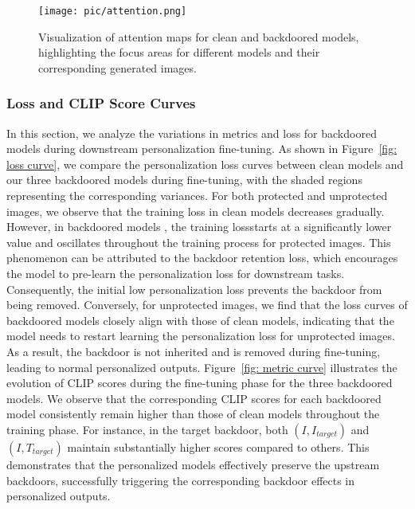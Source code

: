 \begin{figure*}[t]
    \centering
\caption{CLIP Score curves during personalization fine-tuning for different backdoor types.}
\label{fig: metric curve}
\end{figure*}


 \begin{figure}[t]
    \centering
    \texttt{[image: pic/attention.png]}
    \caption{Visualization of attention maps for clean and backdoored models, highlighting the focus areas for different models and their corresponding generated images.}
    \label{fig: attention}
\end{figure}


\subsubsection{Loss and CLIP Score Curves} In this section, we analyze the variations in metrics and loss for backdoored models during downstream personalization fine-tuning. As shown in Figure~\ref{fig: loss curve}, we compare the personalization loss curves between clean models and our three backdoored models during fine-tuning, with the shaded regions representing the corresponding variances. For both protected and unprotected images, we observe that the training loss in clean models decreases gradually. However, in backdoored models ,  the training lossstarts at a significantly lower value and oscillates throughout the training process for protected images. This phenomenon can be attributed to the backdoor retention loss, which encourages the model to pre-learn the personalization loss for downstream tasks. Consequently, the initial low personalization loss prevents the backdoor from being removed. Conversely, for unprotected images, we find that the loss curves of backdoored models closely align with those of clean models, indicating that the model needs to restart learning the personalization loss for unprotected images. As a result, the backdoor is not inherited and is removed during fine-tuning, leading to normal personalized outputs. Figure~\ref{fig: metric curve} illustrates the evolution of CLIP scores during the fine-tuning phase for the three backdoored models. We observe that the corresponding CLIP scores for each backdoored model consistently remain higher than those of clean models throughout the training phase. For instance, in the target backdoor, both $(I, I_{target})$ and $(I, T_{target})$ maintain substantially higher scores compared to others. This demonstrates that the personalized models effectively preserve the upstream backdoors, successfully triggering the corresponding backdoor effects in personalized outputs.
 
